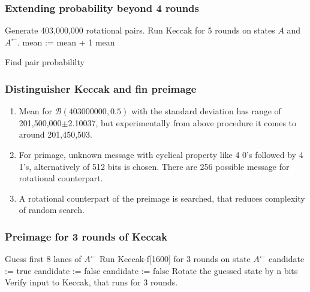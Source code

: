 \documentclass{beamer}
\begin{document}
\begin{frame}
\frametitle{Extending probability beyond 4 rounds}
  \begin{algorithm}[H]
  \begin{algorithmic}[1]
    \State Generate 403,000,000 rotational pairs.
      \State Run Keccak for 5 rounds on states $A$ and $A^{\leftarrow}$.
      \State mean := mean + 1
      \EndIf
    \EndFor
    \State \Return mean
  \end{algorithmic}
  \caption[Find pair probabililty]{Find pair probabililty\footnotemark}
  \label{alg:seq}
  \end{algorithm}
\end{frame}

\begin{frame}
\frametitle{Distinguisher Keccak and fin preimage}
\begin{enumerate}
\item Mean for $\mathcal{B}(403000000, 0.5)$ with the standard deviation has range of 201,500,000$\pm$2.10037, 
but experimentally from above procedure it comes to around 201,450,503.
\item For primage, unknown message with cyclical property like 4 0's followed by 4 1's, alternatively of 512 bits
is chosen. There are 256 possible message for rotational counterpart.
\item A rotational counterpart of the preimage is searched, that reduces complexity of random search.
\end{enumerate}
\end{frame}

\begin{frame}[allowframebreaks]
\frametitle{Preimage for 3 rounds of Keccak \footnotemark}
\begin{algorithmic}[1]
  \State Guess first 8 lanes of $A^{\leftarrow}$
  \State Run Keccak-f[1600] for 3 rounds on state $A^{\leftarrow}$
    \State candidate := true
        \State candidate := false
      \EndIf
        \State candidate := false
      \EndIf
    \EndFor
      \State Rotate the guessed state by n bits
      \State Verify input to Keccak, that runs for 3 rounds.
    \EndIf
  \EndFor
\end{algorithmic}
\end{frame}
\end{document}
